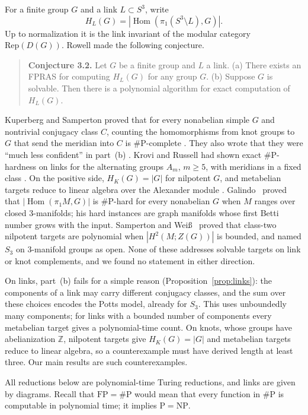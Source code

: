 \documentclass[11pt]{article}
\theoremstyle{definition}
\theoremstyle{remark}
\newcommand{\Z}{\mathbb{Z}}
\newcommand{\Hom}{\operatorname{Hom}}
\newcommand{\sharpP}{\#\mathrm{P}}
\newcommand{\FP}{\mathrm{FP}}
\begin{document}
For a finite group $G$ and a link $L\subset S^3$, write
\[
H_L(G)=|\Hom(\pi_1(S^3\setminus L),G)|.
\]
Up to normalization it is the link invariant of the modular category
$\mathrm{Rep}(D(G))$. Rowell
\cite[\S3.3.5]{Row09} made the following conjecture.

\begin{quote}
\textbf{Conjecture 3.2.} Let $G$ be a finite group and $L$ a link.
(a) There exists an FPRAS for computing $H_L(G)$ for any group $G$.
(b) Suppose $G$ is solvable. Then there is a polynomial algorithm for exact
computation of $H_L(G)$.
\end{quote}

Kuperberg and Samperton proved that for every nonabelian simple $G$ and
nontrivial conjugacy class $C$, counting the homomorphisms from knot groups to
$G$ that send the meridian into $C$ is $\sharpP$-complete \cite{KS21}. They also wrote that they were ``much less
confident'' in part~(b) \cite[\S5.3]{KS18}. Krovi and Russell had shown exact
$\sharpP$-hardness on links for the alternating groups $A_m$, $m\ge5$, with
meridians in a fixed class \cite{KR15}. On the
positive side, $H_K(G)=|G|$ for nilpotent $G$, and metabelian targets reduce
to linear algebra over the Alexander module \cite[\S1]{KS21}.
Galindo~\cite{Gal26} proved that $|\Hom(\pi_1M,G)|$ is $\sharpP$-hard for
every nonabelian $G$ when $M$ ranges over closed 3-manifolds; his hard
instances are graph manifolds whose first Betti number grows with the input.
Samperton and Wei\ss~\cite{SW26} proved that class-two nilpotent targets are
polynomial when $|H^2(M;Z(G))|$ is bounded, and named $S_3$ on 3-manifold groups
as open. None of these addresses solvable targets on link or knot complements,
and we found no statement in either direction.

On links, part~(b) fails for a simple reason (Proposition~\ref{prop:links}): the
components of a link may carry different conjugacy classes, and the sum over
these choices encodes the Potts model, already for $S_3$. This uses unboundedly
many components; for links with a bounded number of components every
metabelian target gives a polynomial-time count. On knots, whose groups have
abelianization $\Z$, nilpotent targets give $H_K(G)=|G|$ and metabelian
targets reduce to linear algebra, so a counterexample must have derived length
at least three. Our main results are such counterexamples.

All reductions below are polynomial-time Turing reductions, and links are
given by diagrams. Recall that $\FP=\sharpP$ would mean that every function
in $\sharpP$ is computable in polynomial time; it implies $\mathrm{P}=
\mathrm{NP}$.
\end{document}
